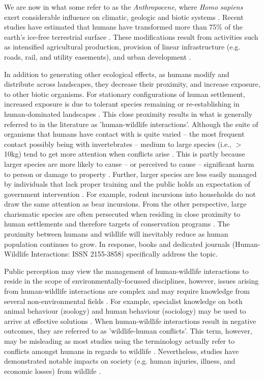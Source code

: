We are now in what some refer to as the \textit{Anthropocene}, where \textit{Homo sapiens} exert considerable influence on climatic, geologic and biotic systems \citep{crut06}. Recent studies have estimated that humans have transformed more than 75\% of the earth's ice-free terrestrial surface \citep{elli08}. These modifications result from activities such as intensified agricultural production, provision of linear infrastructure (e.g. roads, rail, and utility easements), and urban development \citep{vito97,sand02,fole05}.

In addition to generating other ecological effects, as humans modify and distribute across landscapes, they decrease their proximity, and increase exposure, to other biotic organisms. For stationary configurations of human settlement, increased exposure is due to tolerant species remaining or re-establishing in human-dominated landscapes \citep{soul16}. This close proximity results in what is generally referred to in the literature as 'human-wildlife interactions'. Although the suite of organisms that humans have contact with is quite varied -- the most frequent contact possibly being with invertebrates -- medium to large species (i.e., $>$10kg) tend to get more attention when conflicts arise \citep{seor16}. This is partly because larger species are more likely to cause -- or perceived to cause -- significant harm to person or damage to property \citep{cono01}. Further, larger species are less easily managed by individuals that lack proper training and the public holds an expectation of government intervention \citep{reit99}. For example, rodent incursions into households do not draw the same attention as bear incursions. From the other perspective, large charismatic species are often persecuted when residing in close proximity to human settlements and therefore targets of conservation programs \citep{trev03}. The proximity between humans and wildlife will inevitably reduce as human population continues to grow. In response, books \citep{manf08} and dedicated journals (Human-Wildlife Interactions: ISSN 2155-3858) specifically address the topic.

Public perception may view the management of human-wildlife interactions to reside in the scope of environmentally-focussed disciplines, however, issues arising from human-wildlife interactions are complex and may require knowledge from several non-environmental fields \citep{deck97,madd04}. For example, specialist knowledge on both animal behaviour (zoology) and human behaviour (sociology) may be used to arrive at effective solutions \citep{dicka10}. When human-wildlife interactions result in negative outcomes, they are referred to as 'wildlife-human conflicts'. This term, however, may be misleading as most studies using the terminology actually refer to conflicts amongst humans in regards to wildlife \citep{pete10}. Nevertheless, studies have demonstrated notable impacts on society (e.g. human injuries, illness, and economic losses) from wildlife \citep{cono95}. 

